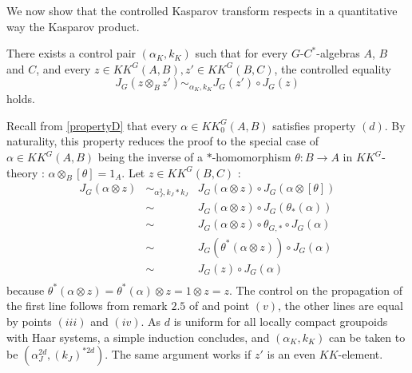 We now show that the controlled Kasparov transform respects in a quantitative way the Kasparov product.

\begin{prop} There exists a control pair $(\alpha_K,k_K)$ such that for every $G$-$C^*$-algebras $A$, $B$ and $C$, and every $z\in KK^G(A,B),z'\in KK^G(B,C)$, the controlled equality
\[J_G(z\otimes_B z') \sim_{\alpha_K,k_K} J_G(z')\circ J_G(z)\]
holds.
\end{prop}
\begin{dem}
Recall from \ref{propertyD} that every $\alpha\in KK_0^G(A,B)$ satisfies property $(d)$. By naturality, this property reduces the proof to the special case of $\alpha\in KK^G(A,B)$ being the inverse of a $*$-homomorphism $\theta : B\rightarrow A$ in $KK^G$-theory : $\alpha\otimes_B [\theta]=1_A$. Let $z\in KK^G(B,C)$ :
\[\begin{array}{rcl}
J_G (\alpha\otimes z) & \sim_{\alpha_J^2,k_J*k_J} &  J_G(\alpha\otimes z)\circ J_G(\alpha\otimes [\theta]) \\
			& \sim & J_G(\alpha\otimes z)\circ J_G(\theta_*(\alpha))\\
			& \sim & J_G(\alpha\otimes z)\circ \theta_{G,*}\circ J_G(\alpha)\\
			& \sim & J_G(\theta^*(\alpha\otimes z))\circ J_G(\alpha)\\
			& \sim & J_G(z)\circ J_G(\alpha) \\
\end{array}\] 
because $\theta^*(\alpha\otimes z)=\theta^*(\alpha)\otimes z=1\otimes z =z$. The control on the propagation of the first line follows from remark $2.5$ of \cite{OY2} and point $(v)$, the other lines are equal by points $(iii)$ and $(iv)$. As $d$ is uniform for all locally compact groupoids with Haar systems, a simple induction concludes, and $(\alpha_K,k_K)$ can be taken to be $( \alpha_J^{2d},( k_J)^{*2d})$. The same argument works if $z'$ is an even $KK$-element.\\


\end{dem}
